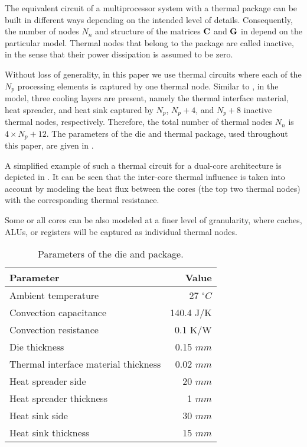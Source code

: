 The equivalent circuit of a multiprocessor system with a thermal package can be built in different ways depending on the intended level of details. Consequently, the number of nodes $N_n$ and structure of the matrices $\mathbf{C}$ and $\mathbf{G}$ in  depend on the particular model. Thermal nodes that belong to the package are called inactive, in the sense that their power dissipation is assumed to be zero.

Without loss of generality, in this paper we use thermal circuits where each of the $N_p$ processing elements is captured by one thermal node. Similar to \cite{huang2003}, in the model, three cooling layers are present, namely the thermal interface material, heat spreader, and heat sink captured by $N_p$, $N_p + 4$, and $N_p + 8$ inactive thermal nodes, respectively. Therefore, the total number of thermal nodes $N_n$ is $4 \times N_p + 12$. The parameters of the die and thermal package, used throughout this paper, are given in .

A simplified example of such a thermal circuit for a dual-core architecture is depicted in . It can be seen that the inter-core thermal influence is taken into account by modeling the heat flux between the cores (the top two thermal nodes) with the corresponding thermal resistance.

Some or all cores can be also modeled at a finer level of granularity, where caches, ALUs, or registers will be captured as individual thermal nodes.
\begin{table}[b]
  \vspace{15pt}
  \caption{Parameters of the die and package.}
  \label{tab:parameters}
  \centering
  \begin{tabular}{|l|r|}
    \hline
    Parameter & Value \\
    \hline
    \hline
    Ambient temperature                   &   27 ${}^\circ C$ \\
    Convection capacitance                & 140.4 J/K \\
    Convection resistance                 & 0.1 K/W \\
    Die thickness                         & 0.15 $mm$ \\
    Thermal interface material thickness  & 0.02 $mm$ \\
    Heat spreader side                    &   20 $mm$ \\
    Heat spreader thickness               &    1 $mm$ \\
    Heat sink side                        &   30 $mm$ \\
    Heat sink thickness                   &   15 $mm$ \\
    \hline
  \end{tabular}
\end{table}
